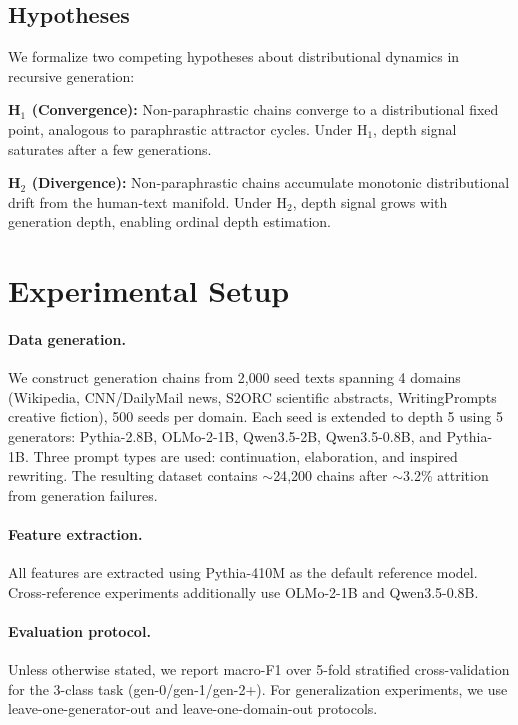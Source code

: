 \documentclass[letterpaper, 10pt]{article}
\begin{document}
\subsection{Hypotheses}

We formalize two competing hypotheses about distributional dynamics in recursive generation:

\noindent\textbf{H$_1$ (Convergence):} Non-paraphrastic chains converge to a distributional fixed point, analogous to paraphrastic attractor cycles.
Under H$_1$, depth signal saturates after a few generations.

\noindent\textbf{H$_2$ (Divergence):} Non-paraphrastic chains accumulate monotonic distributional drift from the human-text manifold.
Under H$_2$, depth signal grows with generation depth, enabling ordinal depth estimation.

\section{Experimental Setup}

\paragraph{Data generation.}
We construct generation chains from 2{,}000 seed texts spanning 4 domains (Wikipedia, CNN/DailyMail news, S2ORC scientific abstracts, WritingPrompts creative fiction), 500 seeds per domain.
Each seed is extended to depth 5 using 5 generators: Pythia-2.8B, OLMo-2-1B, Qwen3.5-2B, Qwen3.5-0.8B, and Pythia-1B.
Three prompt types are used: continuation, elaboration, and inspired rewriting.
The resulting dataset contains $\sim$24{,}200 chains after $\sim$3.2\% attrition from generation failures.

\paragraph{Feature extraction.}
All features are extracted using Pythia-410M as the default reference model.
Cross-reference experiments additionally use OLMo-2-1B and Qwen3.5-0.8B.

\paragraph{Evaluation protocol.}
Unless otherwise stated, we report macro-F1 over 5-fold stratified cross-validation for the 3-class task (gen-0/gen-1/gen-2+).
For generalization experiments, we use leave-one-generator-out and leave-one-domain-out protocols.
\end{document}

